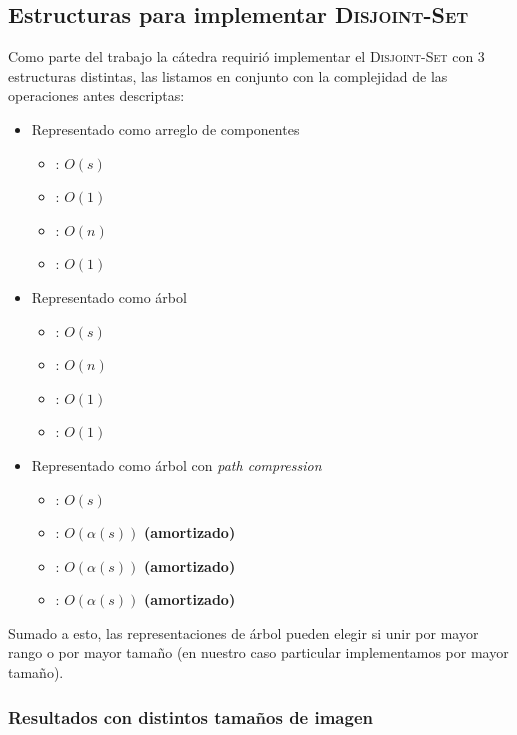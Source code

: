 \subsection{Estructuras para implementar \textsc{Disjoint-Set}}

Como parte del trabajo la cátedra requirió implementar el \textsc{Disjoint-Set}
con 3 estructuras distintas, las listamos en conjunto con la complejidad de las
operaciones antes descriptas:

\begin{itemize}
	\item Representado como arreglo de componentes
	\begin{itemize}
		\item {}: $O(s)$
		\item {}: $O(1)$
		\item {}: $O(n)$
		\item {}: $O(1)$
	\end{itemize}
	\item Representado como árbol
	\begin{itemize}
		\item {}: $O(s)$
		\item {}: $O(n)$
		\item {}: $O(1)$
		\item {}: $O(1)$
	\end{itemize}
	\item Representado como árbol con \emph{path compression}
	\begin{itemize}
		\item {}: $O(s)$
		\item {}: $O(\alpha(s))$
			\textbf{(amortizado)}
		\item {}: $O(\alpha(s))$
			\textbf{(amortizado)}
		\item {}: $O(\alpha(s))$
			\textbf{(amortizado)}
	\end{itemize}
\end{itemize}

Sumado a esto, las representaciones de árbol pueden elegir si unir por mayor
rango o por mayor tamaño (en nuestro caso particular implementamos por mayor
tamaño).

\subsubsection{Resultados con distintos tamaños de imagen}

